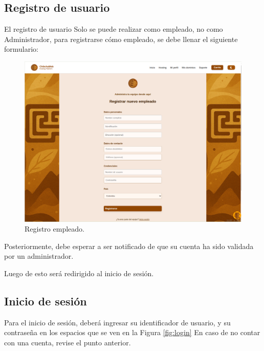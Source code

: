 \subsection{Registro de usuario }
El registro de usuario Solo se puede realizar como empleado, no como Administrador, para registrarse cómo empleado, se debe llenar el siguiente formulario:

\begin{figure}[H]
    \centering
    \includegraphics[width=0.8\linewidth]{acceso/registro-empleado.png}
    \caption{Registro empleado.}
    \label{fig:registro-empleado}
\end{figure}

Posteriormente, debe esperar a ser notificado de que su cuenta ha sido validada por un administrador.

Luego de esto será redirigido al inicio de sesión.

\subsection{Inicio de sesión}
Para el inicio de sesión, deberá ingresar su identificador de usuario, y su contraseña en los espacios que se ven en la Figura \ref{fig:login} En caso de no contar con una cuenta, revise el punto anterior.

